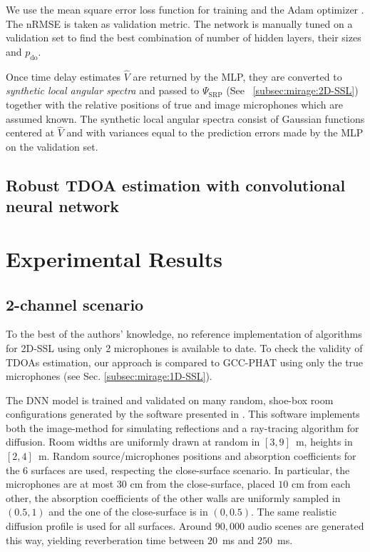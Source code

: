 \mynewline
We use the mean square error loss function for training and the Adam optimizer .
The \acf{nRMSE}  is taken as validation metric.
The network is manually tuned on a validation set to find the best combination of number of hidden layers, their sizes and $p_\text{do}$.

\mynewline
Once time delay estimates $\hat{V}$ are returned by the \ac{MLP}, they are converted to \textit{synthetic local angular spectra} and passed to $\Psi_\text{SRP}$ (See~  \cref{subsec:mirage:2D-SSL})
together with the relative positions of true and image microphones which are assumed known.
The synthetic local angular spectra consist of Gaussian functions centered at $\hat{V}$ and with variances equal to the prediction errors made by the \ac{MLP} on the validation set.

\subsection{Robust TDOA estimation with convolutional neural network}

\section{Experimental Results}\label{sec:mirage:exp}

\subsection{2-channel scenario}
To the best of the authors' knowledge, no reference implementation of algorithms for 2D-SSL using only 2 microphones is available to date.
To check the validity of \ac{TDOA}s estimation, our approach is compared to \ac{GCC-PHAT} using only the true microphones (see Sec. \cref{subsec:mirage:1D-SSL}).

\mynewline
The \ac{DNN} model is trained and validated on many random, shoe-box room configurations generated by the software presented in .
This software implements both the image-method for simulating reflections and a ray-tracing algorithm for diffusion.
Room widths are uniformly drawn at random in $[3, 9]$~m, heights in $[2, 4]$~m.
Random source/microphones positions and absorption coefficients for the 6 surfaces are used,
respecting the close-surface scenario. In particular, the microphones are at most $30$ cm from the close-surface,
placed $10$ cm from each other, the absorption coefficients of the other walls are
uniformly sampled in $(0.5, 1)$ and the one of the close-surface is in $(0, 0.5)$.
The same realistic diffusion profile  is used for all surfaces.
Around $90,000$ audio scenes are generated this way, yielding reverberation time \RT{} between $20$~ms and $250$~ms.

